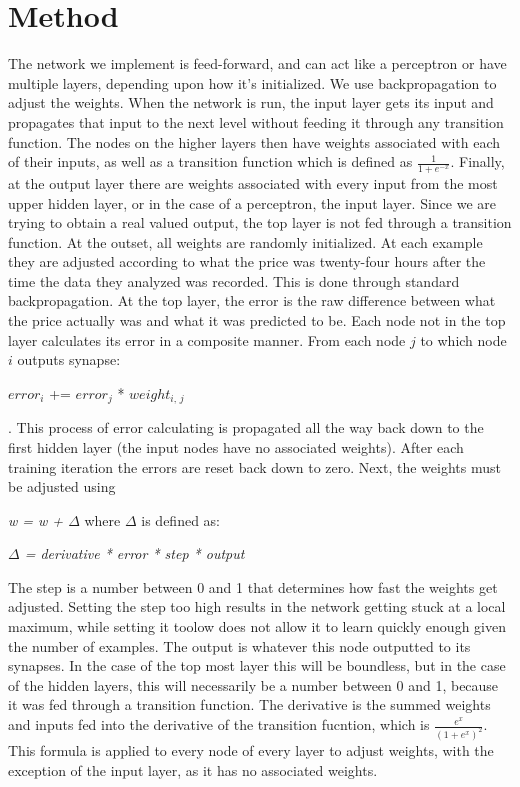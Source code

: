\documentclass[a4paper,11pt]{article}
\begin{document}
\section{Method}
The network we implement is feed-forward, and can act like a perceptron or have multiple layers, depending
upon how it's initialized.  We use backpropagation to adjust the weights.  When the network is run, the input
layer gets its input and propagates that input to the next level without feeding it through any transition 
function.  The nodes on the higher layers then have weights associated with each of their inputs, as well as
a transition function which is defined as $\frac{1}{1 + e^{-x}}$.  Finally, at the output layer there are weights
associated with every input from the most upper hidden layer, or in the case of a perceptron, the input layer.  Since
we are trying to obtain a real valued output, the top layer is not fed through a transition function.  At the outset,
all weights are randomly initialized.  At each example they are adjusted according to what the price was twenty-four
hours after the time the data they analyzed was recorded.  This is done through standard backpropagation.  At the top
layer, the error is the raw difference between what the price actually was and what it was predicted to be.  Each node
not in the top layer calculates its error in a composite manner.  From each node $\textit{j}$ to which node $\textit{i}$ outputs
synapse:
\newline \newline \centerline{$error_{\textit{i}}$ += $error_{\textit{j}}$ * $weight_{\textit{i, j}}$}.  
\newline \newline This process of error
calculating is propagated all the way back down to the first hidden layer (the input nodes have no associated weights).
After each training iteration the errors are reset back down to zero.
Next, the weights must be adjusted using \newline \newline 
\centerline{\textit{w = w + $\Delta$} where $\Delta$ is defined as:} \newline \newline 
\centerline{\textit{$\Delta$ = derivative * error * step * output}}  
\newline \newline The step is a
number between 0 and 1 that determines how fast the weights get adjusted.  Setting the step too high results in the
network getting stuck at a local maximum, while setting it toolow does not allow it to learn quickly enough given the number
of examples.  The output is whatever this node outputted to its synapses.  In the case of the top most layer this will be 
boundless, but in the case of the hidden layers, this will necessarily be a number between 0 and 1, because it was fed through
a transition function.  The derivative is the summed weights and inputs fed into the derivative of the transition fucntion, which
is {$\frac{e^{x}}{({1 + e^{x}})^{2}}$}.
This formula is applied to every node of every layer to adjust weights, with the exception of the input
layer, as it has no associated weights.
\end{document}
